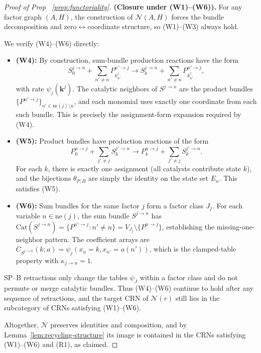 \documentclass{article}
\theoremstyle{plain}
\theoremstyle{definition}
\theoremstyle{remark}
\newcommand{\Cat}{\textrm{Cat}}
\newcommand{\<}{\langle}
\renewcommand{\>}{\rangle}
\begin{document}
\begin{proof}[Proof of Prop ~\ref{prop:functoriality}]
\medskip
\noindent\textbf{(Closure under (W1)--(W6)).} 
For any factor graph $(A, H)$, the construction of $\mathcal{N}(A, H)$ forces the bundle 
decomposition and zero$\leftrightarrow$coordinate structure, so (W1)--(W3) always hold. 

We verify (W4)--(W6) directly:
\begin{itemize}
\item \textbf{(W4):} By construction, sum-bundle production reactions have the form
\[
S^{j \to n}_0 + \sum_{n' \neq n} P^{n' \to j}_{k^j_{n'}} \to S^{j \to n}_k + \sum_{n' \neq n} P^{n' \to j}_{k^j_{n'}},
\]
with rate $\psi_j(\mathbf{k}^j)$. The catalytic neighbors of $S^{j \to n}$ are the 
product bundles $\{P^{n' \to j}\}_{n' \in \mathrm{ne}(j) \setminus n}$, and each 
monomial uses exactly one coordinate from each such bundle. This is precisely the 
assignment-form expansion required by (W4).

\item \textbf{(W5):} Product bundles have production reactions of the form
\[
P^{n \to j}_0 + \sum_{j' \neq j} S^{j' \to n}_k \to P^{n \to j}_k + \sum_{j' \neq j} S^{j' \to n}_k.
\]
For each $k$, there is exactly one assignment (all catalysts contribute state $k$), 
and the bijections $\theta_{P,B}$ are simply the identity on the state set $E_n$. 
This satisfies (W5).

\item \textbf{(W6):} Sum bundles for the same factor $j$ form a factor class $J_j$. 
For each variable $n \in \mathrm{ne}(j)$, the sum bundle $S^{j \to n}$ has 
$\Cat(S^{j \to n}) = \{P^{n' \to j} : n' \neq n\} = V_{J_j} \setminus \{P^{n \to j}\}$, 
establishing the missing-one-neighbor pattern. The coefficient arrays are 
$C_{S^{j \to n}}(k; a) = \psi_j(x_n = k, x_{n'} = a(n'))$, which is the clamped-table 
property with $\kappa_{j \to n} = 1$.
\end{itemize}

SP--B retractions only change the tables $\psi_J$ within a factor class and do not 
permute or merge catalytic bundles. Thus (W4)--(W6) continue to hold after any 
sequence of retractions, and the target CRN of $\mathcal{N}(r)$ still lies in the 
subcategory of CRNs satisfying (W1)--(W6).

\medskip
Altogether, $\mathcal{N}$ preserves identities and composition, and by Lemma~\ref{lem:recycling-structure} 
its image is contained in the CRNs satisfying (W1)--(W6) and (R1), as claimed.
\end{proof}
\end{document}
